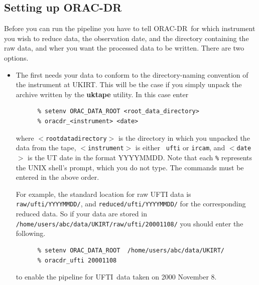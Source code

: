 \documentclass[twoside,11pt]{article}
\newcommand{\htmladdnormallink}[2]{#1}
\newcommand{\xlabel}[1]{}
\renewcommand{\_}{\texttt{\symbol{95}}}
\newcommand{\ORACDR}{{\footnotesize ORAC-DR}}
\newcommand{\UFTI}{\htmladdnormallink{UFTI}{http://www.jach.hawaii.edu/JACpublic/UKIRT/instruments/ufti/ufti.html}}
\begin{document}
\subsection{\xlabel{setting_up_orac-dr}Setting up \ORACDR\label{setting_up_orac-dr}}

Before you can run the pipeline you have to tell \ORACDR\ for which
instrument you wish to reduce data, the observation date, and the
directory containing the raw data, and wher you want the processed
data to be written.  There are two options.

\begin{itemize}

\item  The first needs your data to conform to the directory-naming
convention of the instrument at UKIRT.  This will be the case if you
simply unpack the archive written by the {\bf uktape} utility.  In
this case enter

\begin{verbatim}
      % setenv ORAC_DATA_ROOT <root_data_directory>
      % oracdr_<instrument> <date>
\end{verbatim}
where {\tt $<$root\_data\_directory$>$} is the directory in which you
unpacked the data from the tape, {\tt $<$instrument$>$} is either {\tt
ufti} or {\tt ircam}, and {\tt$<$date$>$} is the UT date in the format
YYYYMMDD.  Note that each \texttt{\%} represents the UNIX shell's
prompt, which you do not type.  The commands must be entered in the
above order.  

For example, the standard location for raw UFTI data is {\tt
raw/ufti/YYYYMMDD/}, and {\tt reduced/ufti/YYYYMMDD/} for the
corresponding reduced data.  So if your data are stored in {\tt
/home/users/abc/data/UKIRT/raw/ufti/20001108/} you should enter the
following.

\begin{verbatim}
      % setenv ORAC_DATA_ROOT  /home/users/abc/data/UKIRT/
      % oracdr_ufti 20001108
\end{verbatim}
to enable the pipeline for \UFTI\ data taken on 2000 November 8.


\end{itemize}
\end{document}
